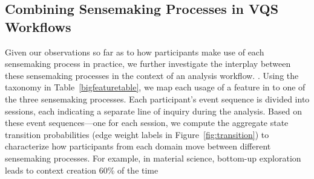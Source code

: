 \subsection{Combining Sensemaking Processes in VQS Workflows}
 Given our observations so far as to how participants make use of each sensemaking process in practice, we  further investigate the interplay between these sensemaking processes in the context of an analysis workflow. %
 .
 Using the taxonomy in Table~\ref{bigfeaturetable}, we map each usage of a feature in \zvpp to one of the three sensemaking processes.
 Each participant's event sequence
 is divided into sessions,
 each indicating a separate line of inquiry
 during the analysis.
 Based on these event sequences---one for each session,
 we compute the aggregate state transition probabilities
 (edge weight labels in Figure~\ref{fig:transition})
 to characterize how participants from each domain
 move between different sensemaking processes.
 For example, in material science,
 bottom-up exploration
 leads to context creation 60\% of the time
